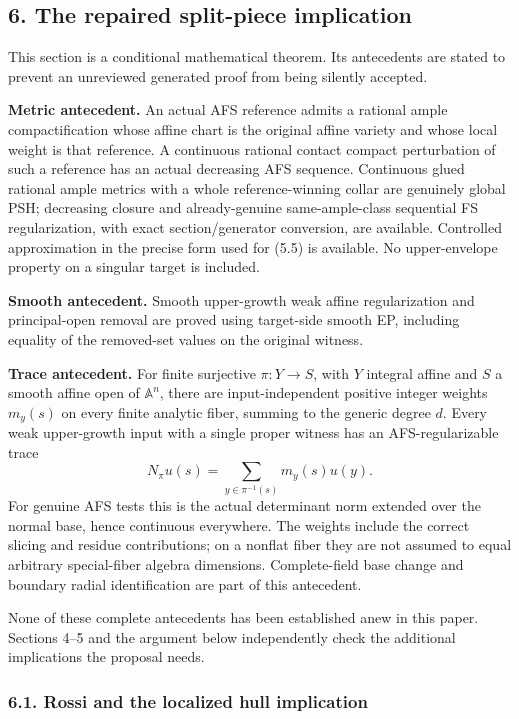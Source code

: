 \documentclass[
  10pt,
]{article}
\begin{document}
\subsection{6. The repaired split-piece
implication}\label{the-repaired-split-piece-implication}

This section is a conditional mathematical theorem. Its antecedents are
stated to prevent an unreviewed generated proof from being silently
accepted.

\textbf{Metric antecedent.} An actual AFS reference admits a rational
ample compactification whose affine chart is the original affine variety
and whose local weight is that reference. A continuous rational contact
compact perturbation of such a reference has an actual decreasing AFS
sequence. Continuous glued rational ample metrics with a whole
reference-winning collar are genuinely global PSH; decreasing closure
and already-genuine same-ample-class sequential FS regularization, with
exact section/generator conversion, are available. Controlled
approximation in the precise form used for (5.5) is available. No
upper-envelope property on a singular target is included.

\textbf{Smooth antecedent.} Smooth upper-growth weak affine
regularization and principal-open removal are proved using target-side
smooth EP, including equality of the removed-set values on the original
witness.

\textbf{Trace antecedent.} For finite surjective \(\pi:Y\to S\), with
\(Y\) integral affine and \(S\) a smooth affine open of \(\mathbb A^n\),
there are input-independent positive integer weights \(m_y(s)\) on every
finite analytic fiber, summing to the generic degree \(d\). Every weak
upper-growth input with a single proper witness has an AFS-regularizable
trace \[N_\pi u(s)=\sum_{y\in\pi^{-1}(s)}m_y(s)u(y). \tag{6.1}\] For
genuine AFS tests this is the actual determinant norm extended over the
normal base, hence continuous everywhere. The weights include the
correct slicing and residue contributions; on a nonflat fiber they are
not assumed to equal arbitrary special-fiber algebra dimensions.
Complete-field base change and boundary radial identification are part
of this antecedent.

None of these complete antecedents has been established anew in this
paper. Sections 4--5 and the argument below independently check the
additional implications the proposal needs.

\subsubsection{6.1. Rossi and the localized hull
implication}\label{rossi-and-the-localized-hull-implication}
\end{document}
